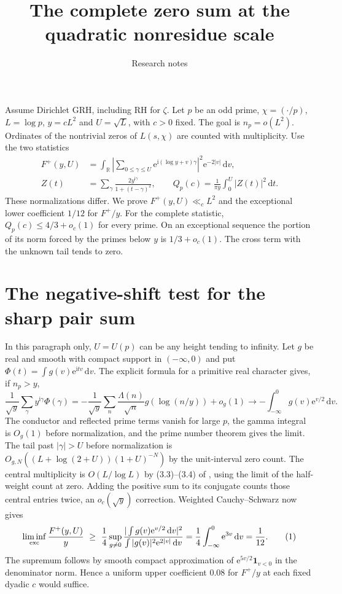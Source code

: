 \documentclass[11pt]{article}
\title{The complete zero sum at the quadratic nonresidue scale}
\author{Research notes}
\date{}
\newcommand{\R}{\mathbb R}
\newcommand{\e}{\mathrm e}
\newcommand{\ii}{\mathrm i}
\newcommand{\dd}{\,\mathrm d}
\newcommand{\ind}{\mathbf1}
\begin{document}
\maketitle
Assume Dirichlet GRH, including RH for $\zeta$. Let $p$ be an odd prime,
$\chi=(\cdot/p)$, $L=\log p$, $y=cL^2$ and $U=\sqrt L$, with $c>0$
fixed. The goal is $n_p=o(L^2)$. Ordinates of the nontrivial zeros
of $L(s,\chi)$ are counted with multiplicity. Use the two statistics
\begin{align*}
 F^+(y,U)&=\int_{\R}\left|\sum_{0\le\gamma\le U}
               \e^{\ii(\log y+v)\gamma}\right|^2\e^{-2|v|}\dd v,\\
 Z(t)&=\sum_{\gamma}\frac{2y^{\ii\gamma}}{1+(t-\gamma)^2},\qquad
 Q_p(c)=\frac{1}{\pi y}\int_0^U|Z(t)|^2\dd t .
\end{align*}
These normalizations differ. We prove $F^+(y,U)\ll_c L^2$ and the
exceptional lower coefficient $1/12$ for $F^+/y$. For the complete
statistic, $Q_p(c)\le 4/3+o_c(1)$ for every prime. On an exceptional
sequence the portion of its norm forced by the primes below $y$ is
$1/3+o_c(1)$. The cross term with the unknown tail tends to zero.

\section{The negative-shift test for the sharp pair sum}
In this paragraph only, $U=U(p)$ can be any height tending to infinity.
Let $g$ be real and smooth with compact support in $(-\infty,0)$ and
put $\Phi(t)=\int g(v)\e^{\ii tv}\dd v$. The explicit formula for
a primitive real character \cite[Section 3]{cmqr} gives, if $n_p>y$,
\[
 \frac{1}{\sqrt y}\sum_\gamma y^{\ii\gamma}\Phi(\gamma)
 =-\frac{1}{\sqrt y}\sum_n \frac{\Lambda(n)}{\sqrt n}
                 g(\log(n/y))+o_g(1)
 \longrightarrow-\int_{-\infty}^0 g(v)\e^{v/2}\dd v .
\]
The conductor and reflected prime terms vanish for large $p$, the
gamma integral is $O_g(1)$ before normalization, and the prime number
theorem gives the limit. The tail past $|\gamma|>U$ before normalization
is $O_{g,N}((L+\log(2+U))(1+U)^{-N})$ by the unit-interval zero count.
The central multiplicity is $O(L/\log L)$ by (3.3)--(3.4) of \cite{cmqr},
using the limit of the half-weight count at zero. Adding the positive
sum to its conjugate counts those central entries twice, an $o_c(\sqrt y)$
correction. Weighted Cauchy--Schwarz now gives
\[
 \liminf_{\rm exc}\frac{F^+(y,U)}y\ \ge\
 \frac14\sup_{g\ne0}
 \frac{|\int g(v)\e^{v/2}\dd v|^2}{\int |g(v)|^2\e^{2|v|}\dd v}
 =\frac14\int_{-\infty}^0\e^{3v}\dd v=\frac1{12}.
 \tag{1}
\]
The supremum follows by smooth compact approximation of
$\e^{5v/2}\ind_{v<0}$ in the denominator norm. Hence a uniform upper
coefficient $0.08$ for $F^+/y$ at each fixed dyadic $c$ would suffice.
\end{document}
